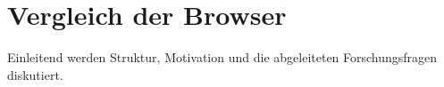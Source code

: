 \chapter{Vergleich der Browser}

Einleitend werden Struktur, Motivation und die abgeleiteten Forschungsfragen diskutiert.

